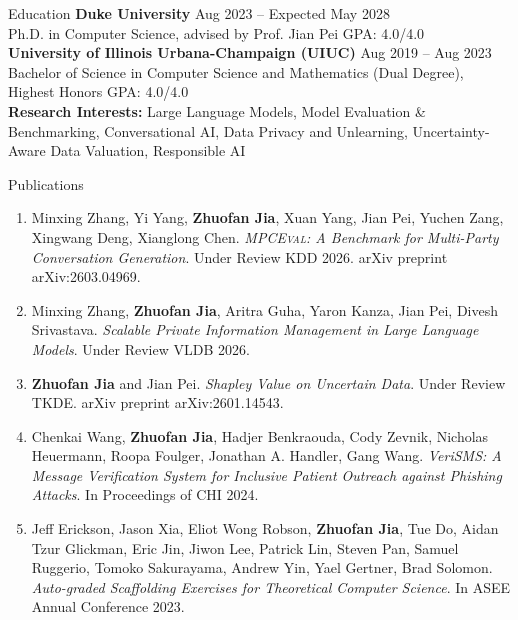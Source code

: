 \documentclass[hidelinks]{resume} %
\begin{document}
\vspace{-5pt}
\begin{rSection}{E\MakeLowercase{ducation}}
{\bf Duke University} \hfill {Aug 2023 -- Expected May 2028}\\
{Ph.D. in Computer Science, advised by Prof. Jian Pei} \hfill {GPA: 4.0/4.0}\smallskip\\
{\bf University of Illinois Urbana-Champaign (UIUC)} \hfill {Aug 2019 – Aug 2023}\\
{Bachelor of Science in Computer Science and Mathematics (Dual Degree), Highest Honors} \smallskip\hfill {GPA: 4.0/4.0}\\
{\bf Research Interests:}
Large Language Models, Model Evaluation \& Benchmarking, Conversational AI, Data Privacy and Unlearning, Uncertainty-Aware Data Valuation, Responsible AI

\end{rSection}

\vspace{-5pt}
\begin{rSection}{P\MakeLowercase{ublications}}
\begin{enumerate}
\itemsep -4pt {}
\item Minxing Zhang, Yi Yang, \textbf{Zhuofan Jia}, Xuan Yang, Jian Pei, Yuchen Zang, Xingwang Deng, Xianglong Chen.
\textit{\textsc{MPCEval}: A Benchmark for Multi-Party Conversation Generation}. Under Review KDD 2026. arXiv preprint arXiv:2603.04969.

\item Minxing Zhang, \textbf{Zhuofan Jia}, Aritra Guha, Yaron Kanza,  Jian Pei, Divesh Srivastava.
\textit{Scalable Private Information Management in Large Language Models}. Under Review VLDB 2026.

\item \textbf{Zhuofan Jia} and Jian Pei.
\textit{Shapley Value on Uncertain Data}. Under Review TKDE.
arXiv preprint arXiv:2601.14543.


\item Chenkai Wang, \textbf{Zhuofan Jia}, Hadjer Benkraouda, Cody Zevnik, Nicholas Heuermann, Roopa Foulger, Jonathan A. Handler, Gang Wang.
\textit{VeriSMS: A Message Verification System for Inclusive Patient Outreach against Phishing Attacks}.
  In Proceedings of CHI 2024.
  
\item Jeff Erickson, Jason Xia, Eliot Wong Robson, \textbf{Zhuofan Jia}, Tue Do, Aidan Tzur Glickman, Eric Jin, Jiwon Lee, Patrick Lin, Steven Pan, Samuel Ruggerio, Tomoko Sakurayama, Andrew Yin, Yael Gertner, Brad Solomon.
\textit{Auto-graded Scaffolding Exercises for Theoretical Computer Science}.
In ASEE Annual Conference 2023.
\end{enumerate}
\end{rSection} 
\end{document}
